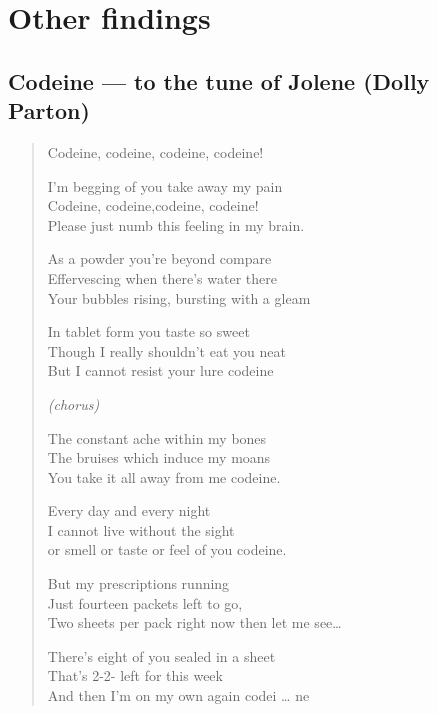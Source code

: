 \section{Other findings}


	\subsection{Codeine --- to the tune of Jolene (Dolly Parton)}
		
		\begin{verse}
			\begin{centering}
				Codeine, codeine, codeine, codeine!
				
				
				I’m begging of you take away my pain\\
				Codeine, codeine,codeine, codeine!\\
				Please just numb this feeling in my brain.
				
				
				As a powder you’re beyond compare\\
				Effervescing when there’s water there\\
				Your bubbles rising, bursting with a gleam
				
				
				In tablet form you taste so sweet\\
				Though I really shouldn’t eat you neat\\
				But I cannot resist your lure codeine
				
				
				\emph{(chorus)}
				
				
				The constant ache within my bones\\
				The bruises which induce my moans\\
				You take it all away from me codeine.
				
				
				Every day and every night\\
				I cannot live without the sight\\
				or smell or taste or feel of you codeine.
				
				
				But my prescriptions running\\
				Just fourteen packets left to go,\\
				Two sheets per pack right now then let me see…
				
				
				There’s eight of you sealed in a sheet\\
				That’s 2-2- left for this week\\
				And then I’m on my own again codei … ne
				
			\end{centering}
		\end{verse}

